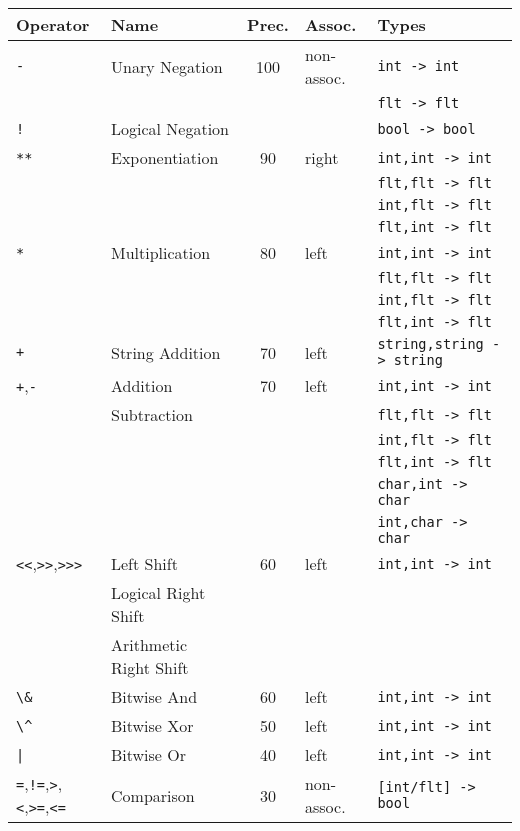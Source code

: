 \documentclass{article}
\newcommand{\code}[1]{\lstinline[columns=fixed]{#1}}
\begin{document}
		\begin{tabular}{l|l|c|l|l}
			\textbf{Operator} & \textbf{Name} & \textbf{Prec.} & \textbf{Assoc.} & \textbf{Types}\\
			\midrule
			\code{-} & Unary Negation & 100 & non-assoc. & \code{int -> int}\\
				&&&& \code{flt -> flt}\\
			\code{!} & Logical Negation &&& \code{bool -> bool}\\
			\midrule
			\code{**} & Exponentiation & 90 & right & \code{int,int -> int}\\
				&&&& \code{flt,flt -> flt}\\
				&&&& \code{int,flt -> flt}\\
				&&&& \code{flt,int -> flt}\\
			\midrule
			\code{*} & Multiplication & 80 & left &
					 \code{int,int -> int}\\
				&&&& \code{flt,flt -> flt}\\
				&&&& \code{int,flt -> flt}\\
				&&&& \code{flt,int -> flt}\\
			\midrule
			\code{+} & String Addition & 70 & left &
				\code{string,string -> string}\\
			\midrule
			\code{+},\code{-} & Addition & 70 & left &
					 \code{int,int -> int}\\
				& Subtraction &&&
					 \code{flt,flt -> flt}\\
				&&&& \code{int,flt -> flt}\\
				&&&& \code{flt,int -> flt}\\
				&&&& \code{char,int -> char}\\
				&&&& \code{int,char -> char}\\
			\midrule
			\code{<<},\code{>>},\code{>>>} & Left Shift & 60 & left & \code{int,int -> int}\\
			& Logical Right Shift &&& \\
			& Arithmetic Right Shift &&& \\
			\midrule
			\code{\&} & Bitwise And & 60 & left & \code{int,int -> int}\\
			\midrule
			\code{\^} & Bitwise Xor & 50 & left & \code{int,int -> int}\\
			\midrule
			\code{|} & Bitwise Or & 40 & left & \code{int,int -> int}\\
			\midrule
			\code{=},\code{!=},\code{>},\code{<},\code{>=},\code{<=} & Comparison & 30 & non-assoc. & \code{[int/flt] -> bool} \\

\end{tabular}
\end{document}
